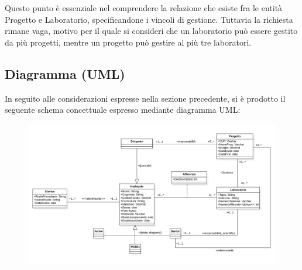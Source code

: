Questo punto è essenziale nel comprendere la relazione che esiste fra le entità Progetto e Laboratorio, specificandone i vincoli di gestione.                  Tuttavia la richiesta rimane vaga, motivo per il quale si consideri che un laboratorio può essere gestito da più progetti, mentre un progetto può gestire al più tre laboratori.

\newpage

\subsection{Diagramma (UML)}

In seguito alle considerazioni espresse nella sezione precedente, si è prodotto il seguente schema concettuale espresso mediante diagramma UML:

\begin{figure}[h]
\includegraphics[width=\textwidth]{images/CONCETTUALE.png}
\end{figure}

\newpage

